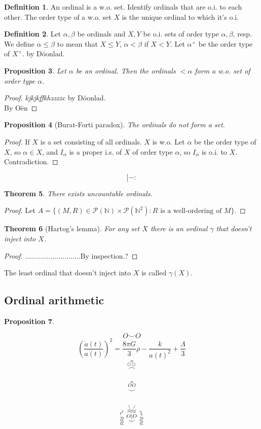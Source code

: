 \documentclass{article}
\theoremstyle{definition}
\newtheorem{defn}{Definition}[section]
\theoremstyle{remark}
\theoremstyle{plain}
\newtheorem{thm}[defn]{Theorem}
\newtheorem{prop}[defn]{Proposition}
\newcommand{\NN}{\mathbb{N}}
\begin{document}
\begin{defn}
    An ordinal is a w.o. set. Identify ordinals that are o.i. to each other. The order type of a w.o. set $X$ is the unique ordinal to which it's o.i.
\end{defn}
\begin{defn}
    Let $\alpha,\beta$ be ordinals and $X, Y$ be o.i. sets of order type $\alpha,\beta$, resp. We define $\alpha\le\beta$ to mean that $X\le Y$, $\alpha<\beta$ if $X<Y$. Let $\alpha^+$ be the order type of $X^+$.  by D\"oonlad.
\end{defn}

\begin{prop}
    Let $\alpha$ be an ordinal. Then the ordinals \(<\alpha\) form a w.o. set of order type $\alpha$.
\end{prop}
\begin{proof}
    \textit{kjkjkffkhzzzzc} by D\"oonlad.\\
     By O\"en
\end{proof}
\begin{prop}[Burat-Forti paradox]
    The ordinals do not form a set.
\end{prop}
\begin{proof}
    If $X$ is a set consisting of all ordinals. $X$ is w.o. Let $\alpha$ be the order type of $X$, so $\alpha\in X$, and $I_\alpha$ is a proper i.s. of $X$ of order type $\alpha$, so $I_\alpha$ is o.i. to $X$. Contradiction.
\end{proof}
\[[-:\tag{Owen's Signature}\]
\begin{thm}
    There exists uncountable ordinals.
\end{thm}
\begin{proof}
    Let $A=\{(M,R)\in \mathscr P(\NN)\times\mathscr P(\NN^2):R\text{ is a well-ordering of }M\}$.
\end{proof}
\begin{thm}[Hartog's lemma]
    For any set $X$ there is an ordinal $\gamma$ that doesn't inject into $X$.
\end{thm}
\begin{proof}
    ............................By inspection.?
\end{proof}
The least ordinal that doesn't inject into $X$ is called $\gamma(X)$.
\subsection*{Ordinal arithmetic}
\begin{prop}
    
\end{prop}
\[O\smile O\tag{Owen's signature}\]
\begin{equation}
   \left( \frac{\dot{a}(t)}{a(t)} \right)^2 = \frac{8\pi G}{3}\rho - \frac{k}{a(t)^2} + \frac{\Lambda}{3}
   \label{eq:friedmann_1}
\end{equation}
\[\overset{\overset{\aquarius}{\odot\odot}}{\frown}\tag{Freddie}\]

\[\overset{\overset{\aquarius}{O_{\hat{}}O}}{\smile}\]

\[\overset{\rotatebox[origin=c]{60}{$\sim$}}{\rotatebox[origin=c]{90}{\aquarius}}\overset{\overset{\overset{\backslash\ /}{\aquarius}}{O\vert O}}{\smile}\overset{\rotatebox[origin=c]{120}{$\sim$}}{\rotatebox[origin=c]{90}{\aquarius}}\]
\end{document}
